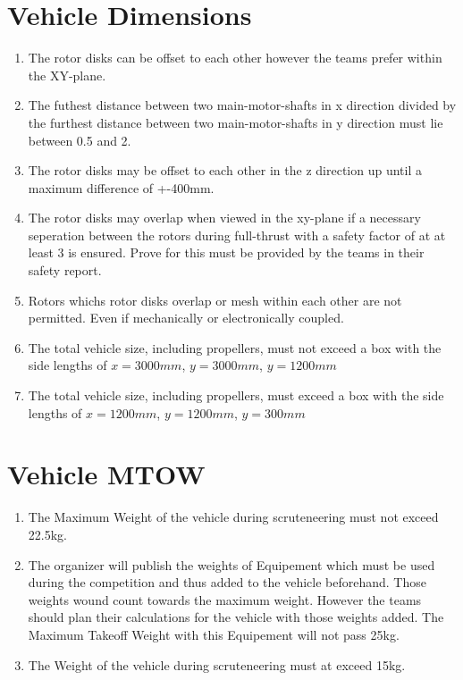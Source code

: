 \documentclass{article}
\begin{document}
\section{Vehicle Dimensions}
\begin{enumerate}
  \item The rotor disks can be offset to each other however the teams prefer within the XY-plane. 
  \item The futhest distance between two main-motor-shafts in x direction divided by the furthest distance between two main-motor-shafts in y direction must lie between 0.5 and 2. 
  \item The rotor disks may be offset to each other in the z direction up until a maximum difference of +-400mm.
  \item The rotor disks may overlap when viewed in the xy-plane if a necessary seperation between the rotors during full-thrust with a safety factor of at at least 3 is ensured. Prove for this must be provided by the teams in their safety report. 
  \item Rotors whichs rotor disks overlap or mesh within each other are not permitted. Even if mechanically or electronically coupled.
  \item The total vehicle size, including propellers, must not exceed a box with the side lengths of $x=3000mm$, $y=3000mm$, $y=1200mm$
  \item The total vehicle size, including propellers, must exceed a box with the side lengths of $x=1200mm$, $y=1200mm$, $y=300mm$
\end{enumerate}

\section{Vehicle MTOW}
\begin{enumerate}
  \item The Maximum Weight of the vehicle during scruteneering must not exceed 22.5kg.
  \item The organizer will publish the weights of Equipement which must be used during the competition and thus added to the vehicle beforehand. Those weights wound count towards the maximum weight. 
  However the teams should plan their calculations for the vehicle with those weights added. The Maximum Takeoff Weight with this Equipement will not pass 25kg.  
  \item The Weight of the vehicle during scruteneering must at exceed 15kg.  
\end{enumerate}
\end{document}
